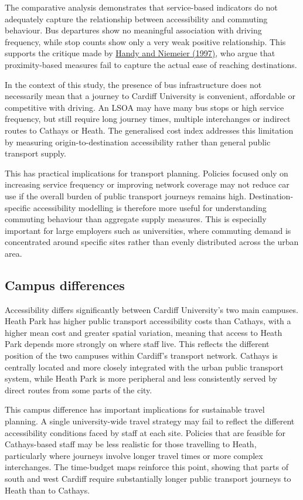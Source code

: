 \documentclass[11pt,a4paper]{article}
\newcommand{\hcite}[2]{\hyperlink{#1}{#2}}
\newcommand{\hcite}[2]{\hyperlink{#1}{#2}}
\begin{document}
The comparative analysis demonstrates that service-based indicators do not adequately capture the relationship between accessibility and commuting behaviour. Bus departures show no meaningful association with driving frequency, while stop counts show only a very weak positive relationship. This supports the critique made by \hcite{handy1997}{Handy and Niemeier (1997)}, who argue that proximity-based measures fail to capture the actual ease of reaching destinations.

In the context of this study, the presence of bus infrastructure does not necessarily mean that a journey to Cardiff University is convenient, affordable or competitive with driving. An LSOA may have many bus stops or high service frequency, but still require long journey times, multiple interchanges or indirect routes to Cathays or Heath. The generalised cost index addresses this limitation by measuring origin-to-destination accessibility rather than general public transport supply.

This has practical implications for transport planning. Policies focused only on increasing service frequency or improving network coverage may not reduce car use if the overall burden of public transport journeys remains high. Destination-specific accessibility modelling is therefore more useful for understanding commuting behaviour than aggregate supply measures. This is especially important for large employers such as universities, where commuting demand is concentrated around specific sites rather than evenly distributed across the urban area.

\subsection{Campus differences}

Accessibility differs significantly between Cardiff University's two main campuses. Heath Park has higher public transport accessibility costs than Cathays, with a higher mean cost and greater spatial variation, meaning that access to Heath Park depends more strongly on where staff live. This reflects the different position of the two campuses within Cardiff's transport network. Cathays is centrally located and more closely integrated with the urban public transport system, while Heath Park is more peripheral and less consistently served by direct routes from some parts of the city.

This campus difference has important implications for sustainable travel planning. A single university-wide travel strategy may fail to reflect the different accessibility conditions faced by staff at each site. Policies that are feasible for Cathays-based staff may be less realistic for those travelling to Heath, particularly where journeys involve longer travel times or more complex interchanges. The time-budget maps reinforce this point, showing that parts of south and west Cardiff require substantially longer public transport journeys to Heath than to Cathays.
\end{document}
